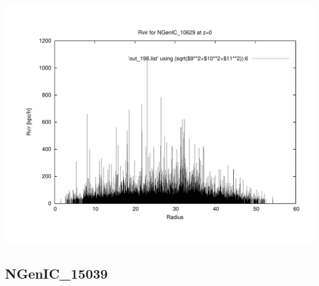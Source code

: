 \includegraphics[scale=0.3]{NGenIC_10629/plot_rvir_z0.pdf}
% 
%
%
%
%
%
%
%


\newpage
\subsection{NGenIC\_15039}

